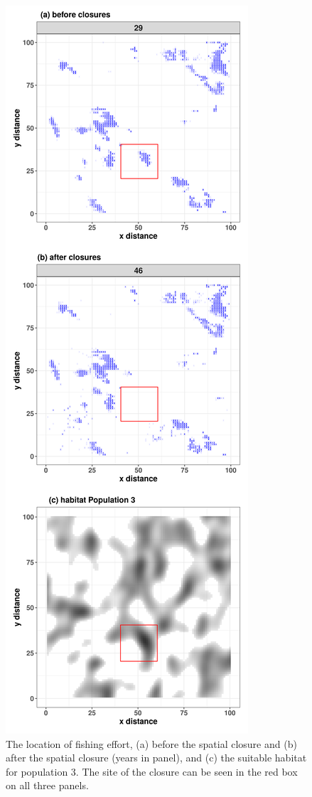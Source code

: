 \documentclass[preprint]{elsarticle}
\begin{document}
\begin{figure}[!ht]
	\centering
	\includegraphics[width =0.5\linewidth]{./Plots/Closure_fishing_locations_yearly}
	\caption{The location of fishing effort, (a) before the spatial closure
		and (b) after the spatial closure (years in panel), and (c) the
		suitable habitat for population 3. The site of the closure can
		be seen in the red box on all three panels.}
	\label{fig:17}
\end{figure}	
\end{document}
